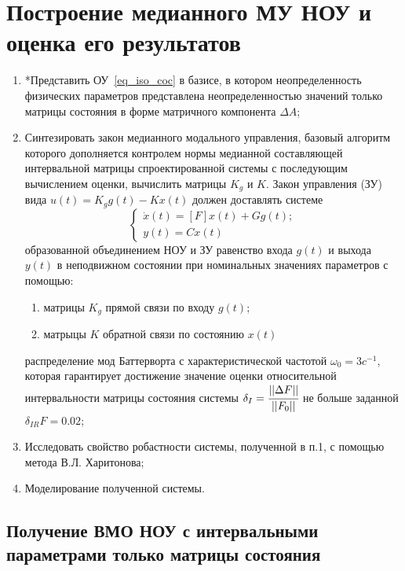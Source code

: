 \section{Построение медианного МУ НОУ и оценка его результатов}

\begin{enumerate}
	\item *Представить ОУ~\ref{eq_iso_coc} в базисе, в котором 	неопределенность физических параметров представлена 	неопределенностью значений только матрицы состояния в	форме матричного компонента $\Delta A$;  
	\item Синтезировать закон медианного модального управления, базовый алгоритм которого дополняется контролем нормы  медианной составляющей интервальной матрицы  спроектированной системы с последующим вычислением оценки, вычислить матрицы $K_g$ и $K$. 
	Закон управления (ЗУ) вида $u(t) = K_g g(t)-K x(t)$ должен доставлять системе
	\begin{equation}
		\begin{cases}
			\dot x (t) = [F] x(t) + G g(t);\\
			y(t) = C x(t)
		\end{cases}
	\end{equation}
	образованной объединением НОУ и ЗУ равенство входа $g(t)$ и выхода $y(t)$ в неподвижном состоянии при номинальных значениях параметров с помощью:
	\begin{enumerate}
		\item матрицы $K_g$ прямой связи по входу $g(t)$;
		\item матрыцы $K$ обратной связи по состоянию $x(t)$
	\end{enumerate}
	распределение мод Баттерворта с характеристической частотой $\omega_0 = 3c^{-1}$, которая гарантирует достижение значение оценки относительной интервальности матрицы состояния системы $\delta_I = \cfrac{||\Delta F||}{||F_0||}$ не больше заданной $\delta_{IR}F = 0.02$; 
	\item Исследовать свойство робастности системы, полученной в п.1, с помощью метода В.Л. Харитонова;
	\item Моделирование полученной системы.
\end{enumerate}

\subsection{Получение ВМО НОУ с интервальными параметрами только матрицы состояния}

